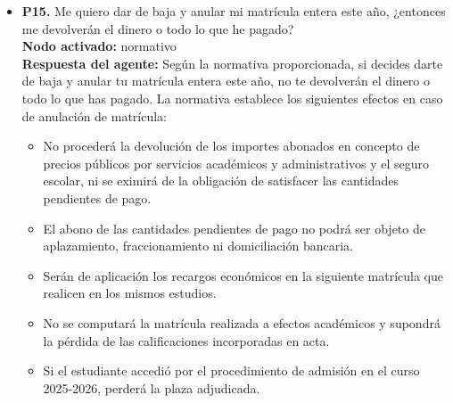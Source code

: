 \documentclass{article}
\begin{document}
\begin{itemize}
            Sin embargo, si se trata de una asignatura matriculada por segunda o posteriores veces, el número de convocatorias agotadas es diferente. Según la información proporcionada en la pantalla, tienes 5 convocatorias agotadas en la asignatura "Microeconomía" y 5 convocatorias agotadas en la asignatura "Anatomía Humana".

            En general, un estudiante tiene derecho a examen y evaluación de las asignaturas matriculadas hasta que se cumplan los requisitos establecidos para aprobarlas. Sin embargo, si no se aprueban después de varias convocatorias, el expediente queda cerrado a todos los efectos.

            Es importante tener en cuenta que cada caso es único y puede haber excepciones o regulaciones adicionales que apliquen en tu situación específica. Te recomiendo consultar con la secretaría del centro o con un asesor académico para obtener información más precisa y personalizada sobre tus derechos y obligaciones como estudiante de la Universidad de Sevilla.

      \item \textbf{P15.} Me quiero dar de baja y anular mi matrícula entera este año, ¿entonces me devolverán el dinero o todo lo que he pagado? \\
            \textbf{Nodo activado:} normativo \\
            \textbf{Respuesta del agente:} Según la normativa proporcionada, si decides darte de baja y anular tu matrícula entera este año, no te devolverán el dinero o todo lo que has pagado. La normativa establece los siguientes efectos en caso de anulación de matrícula:

            \begin{itemize}
                \item No procederá la devolución de los importes abonados en concepto de precios públicos por servicios académicos y administrativos y el seguro escolar, ni se eximirá de la obligación de satisfacer las cantidades pendientes de pago.
                \item El abono de las cantidades pendientes de pago no podrá ser objeto de aplazamiento, fraccionamiento ni domiciliación bancaria.
                \item Serán de aplicación los recargos económicos en la siguiente matrícula que realicen en los mismos estudios.
                \item No se computará la matrícula realizada a efectos académicos y supondrá la pérdida de las calificaciones incorporadas en acta.
                \item Si el estudiante accedió por el procedimiento de admisión en el curso 2025-2026, perderá la plaza adjudicada.
            \end{itemize}


\end{itemize}
\end{document}
